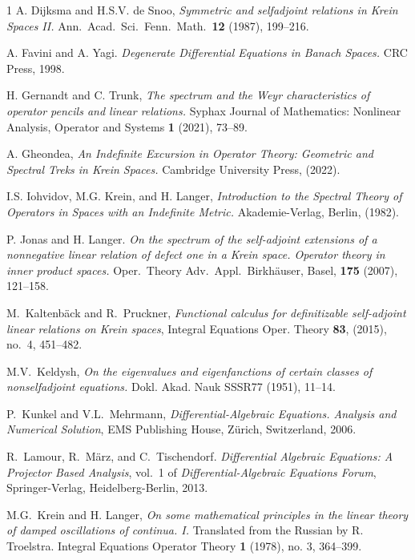 \documentclass{birkjour}
\theoremstyle{definition}
\theoremstyle{remark}
\numberwithin{equation}{section}
\begin{document}
\begin{thebibliography}{1}
A. Dijksma and H.S.V. de Snoo,  \textit{Symmetric and selfadjoint relations in Krein Spaces II.} Ann.\ Acad.\ Sci.\ Fenn.\ Math.\ \textbf{12} (1987), 199--216.

 A. Favini and A. Yagi. \textit{Degenerate Differential Equations in Banach Spaces.} CRC Press, 1998.

 H. Gernandt and C. Trunk,  \textit{The spectrum and the Weyr characteristics of operator pencils and linear relations.} Syphax Journal of Mathematics: Nonlinear Analysis, Operator and Systems \textbf{1} (2021), 73--89.

A. Gheondea,  \textit{An Indefinite Excursion in Operator Theory: Geometric and Spectral Treks
in Krein Spaces.} Cambridge University Press, (2022).

 I.S. Iohvidov, M.G. Krein, and H. Langer,  \textit{
 Introduction to the Spectral Theory of Operators in Spaces with an Indefinite Metric.} Akademie-Verlag, Berlin, (1982).


P. Jonas and H. Langer.  \textit{On the spectrum of the self-adjoint extensions of a nonnegative linear relation of defect one in a Krein space. Operator theory in inner product spaces.} Oper.\ Theory Adv.\ Appl.\ Birkhäuser, Basel, \textbf{175} (2007), 121--158.

M.\ Kaltenb\"{a}ck and R.\ Pruckner, 
\textit{Functional calculus for definitizable self-adjoint linear relations on {Krein} spaces},
Integral Equations Oper. Theory \textbf{83},
(2015), no.\ 4, 451--482.


M.V.\ Keldysh, \textit{On the eigenvalues and eigenfanctions of certain classes of nonselfadjoint equations.} Dokl. Akad. Nauk SSSR77 (1951), 11--14.



P.~Kunkel and V.L.~Mehrmann,
\textit{Differential-Algebraic Equations. Analysis and Numerical Solution}, EMS Publishing House, Z{\"u}rich, Switzerland, 2006.

R.~Lamour, R.~M{\"a}rz, and C.~Tischendorf.
\textit{Differential Algebraic Equations: A Projector Based Analysis}, vol.~1 of {\em Differential-Algebraic Equations Forum}, Springer-Verlag, Heidelberg-Berlin, 2013.


 M.G.\ Krein and H. Langer, \textit{On some mathematical principles in the linear theory of damped oscillations of continua. I.} Translated from the Russian by R. Troelstra. Integral Equations Operator Theory \textbf{1} (1978), no. 3, 364--399.


\end{thebibliography}
\end{document}
